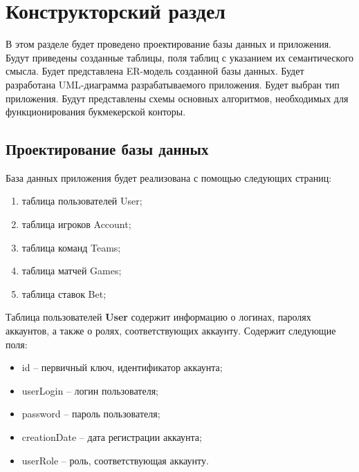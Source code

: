 \section{Конструкторский раздел}
В этом разделе будет проведено проектирование базы данных и приложения.
Будут приведены созданные таблицы, поля таблиц с указанием их семантического смысла.
Будет представлена ER-модель созданной базы данных.
Будет разработана UML-диаграмма разрабатываемого приложения.
Будет выбран тип приложения.
Будут представлены схемы основных алгоритмов, необходимых для функционирования букмекерской конторы.

\subsection{Проектирование базы данных}
База данных приложения будет реализована с помощью следующих страниц:
\begin{enumerate}
	\item таблица пользователей User;
	\item таблица игроков Account;
	\item таблица команд Teams;
	\item таблица матчей Games;
	\item таблица ставок Bet;
\end{enumerate}

Таблица пользователей \textbf{User} содержит информацию о логинах, паролях аккаунтов, а также о ролях, соответствующих аккаунту.
Содержит следующие поля:
\begin{itemize}
	\item id -- первичный ключ, идентификатор аккаунта;
	\item userLogin -- логин пользователя;
	\item password -- пароль пользователя;
	\item creationDate -- дата регистрации аккаунта;
	\item userRole -- роль, соответствующая аккаунту.
\end{itemize}

